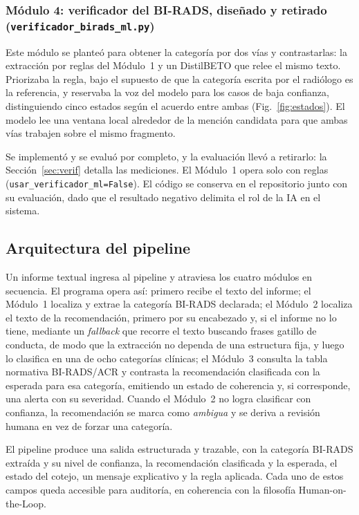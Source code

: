 \documentclass[10pt,journal,a4paper]{IEEEtran}
\newcommand{\codename}[1]{\texttt{#1}}
\begin{document}
\subsubsection{M\'odulo 4: verificador del BI-RADS, dise\~nado y retirado (\codename{verificador\_birads\_ml.py})}
Este m\'odulo se plante\'o para obtener la categor\'ia por dos v\'ias y contrastarlas: la extracci\'on por reglas del M\'odulo~1 y un DistilBETO que relee el mismo texto. Priorizaba la regla, bajo el supuesto de que la categor\'ia escrita por el radi\'ologo es la referencia, y reservaba la voz del modelo para los casos de baja confianza, distinguiendo cinco estados seg\'un el acuerdo entre ambas (Fig.~\ref{fig:estados}). El modelo lee una ventana local alrededor de la menci\'on candidata para que ambas v\'ias trabajen sobre el mismo fragmento.

Se implement\'o y se evalu\'o por completo, y la evaluaci\'on llev\'o a retirarlo: la Secci\'on~\ref{sec:verif} detalla las mediciones. El M\'odulo~1 opera solo con reglas (\codename{usar\_verificador\_ml=False}). El c\'odigo se conserva en el repositorio junto con su evaluaci\'on, dado que el resultado negativo delimita el rol de la IA en el sistema.

\subsection{Arquitectura del pipeline}
Un informe textual ingresa al pipeline y atraviesa los cuatro m\'odulos en secuencia. El programa opera as\'i: primero recibe el texto del informe; el M\'odulo~1 localiza y extrae la categor\'ia BI-RADS declarada; el M\'odulo~2 localiza el texto de la recomendaci\'on, primero por su encabezado y, si el informe no lo tiene, mediante un \emph{fallback} que recorre el texto buscando frases gatillo de conducta, de modo que la extracci\'on no dependa de una estructura fija, y luego lo clasifica en una de ocho categor\'ias cl\'inicas; el M\'odulo~3 consulta la tabla normativa BI-RADS/ACR y contrasta la recomendaci\'on clasificada con la esperada para esa categor\'ia, emitiendo un estado de coherencia y, si corresponde, una alerta con su severidad. Cuando el M\'odulo~2 no logra clasificar con confianza, la recomendaci\'on se marca como \emph{ambigua} y se deriva a revisi\'on humana en vez de forzar una categor\'ia.

El pipeline produce una salida estructurada y trazable, con la categor\'ia BI-RADS extra\'ida y su nivel de confianza, la recomendaci\'on clasificada y la esperada, el estado del cotejo, un mensaje explicativo y la regla aplicada. Cada uno de estos campos queda accesible para auditor\'ia, en coherencia con la filosof\'ia Human-on-the-Loop.
\end{document}
